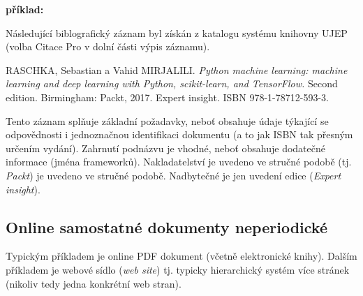 \documentclass[male,czech,api_bc]{kitheses}
\begin{document}
\textbf{příklad:}

Následující biblografický záznam byl získán z katalogu systému knihovny UJEP (volba Citace Pro v dolní části výpis záznamu).

RASCHKA, Sebastian a Vahid MIRJALILI. \textit{Python machine learning: machine learning and deep learning with Python, scikit-learn, and TensorFlow.} Second edition. Birmingham: Packt, 2017. Expert insight. ISBN 978-1-78712-593-3.

Tento záznam splňuje základní požadavky, neboť obsahuje údaje týkající se odpovědnosti i jednoznačnou identifikaci dokumentu (a to jak ISBN tak přesným určením vydání).  Zahrnutí podnázvu
je vhodné, neboť obsahuje dodatečné informace (jména frameworků).
Nakladatelství je uvedeno ve stručné podobě (tj. \textit{Packt}) je uvedeno ve stručné podobě. Nadbytečné je jen uvedení edice (\textit{Expert insight}).

\subsection{Online samostatné dokumenty neperiodické}

Typickým příkladem je online PDF dokument (včetně elektronické knihy). Dalším příkladem je webové sídlo (\textit{web site}) tj. typicky hierarchický systém více stránek (nikoliv tedy jedna konkrétní web stran).
\end{document}
